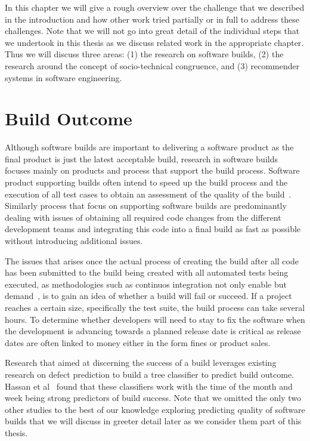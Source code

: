 \label{chap:bg}
In this chapter we will give a rough overview over the challenge that we described in the introduction and how other work tried partially or in full to address these challenges.
Note that we will not go into great detail of the individual steps that we undertook in this thesis as we discuss related work in the appropriate chapter.
Thus we will discuss three areas: (1) the research on software builds, (2) the research around the concept of socio-technical congruence, and (3) recommender systems in software engineering.

\section{Build Outcome}
Although software builds are important to delivering a software product as the final product is just the latest acceptable build, research in software builds focuses mainly on products and process that support the build process.
Software product supporting builds often intend to speed up the build process and the execution of all test cases to obtain an assessment of the quality of the build~\cite{}.
Similarly process that focus on supporting software builds are predominantly dealing with issues of obtaining all required code changes from the different development teams and integrating this code into a final build as fast as possible without introducing additional issues\cite{}.

The issues that arises once the actual process of creating the build after all code has been submitted to the build being created with all automated tests being executed, as methodologies such as continuos integration not only enable but demand~\cite{}, is to gain an idea of whether a build will fail or succeed.
If a project reaches a certain size, specifically the test suite, the build process can take several hours.
To determine whether developers will need to stay to fix the software when the development is advancing towards a planned release date is critical as release dates are often linked to money either in the form fines or product sales.

Research that aimed at discerning the success of a build leverages existing research on defect prediction to build a tree classifier to predict build outcome.
Hassan et al~\cite{} found that these classifiers work with the time of the month and week being strong predictors of build success.
Note that we omitted the only two other studies to the best of our knowledge exploring predicting quality of software builds that we will discuss in greeter detail later as we consider them part of this thesis.

